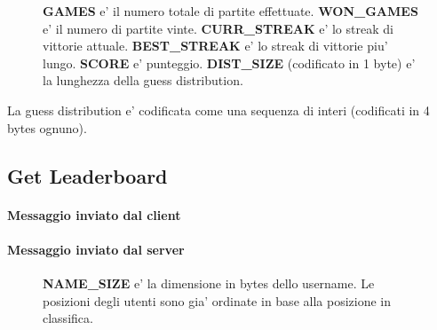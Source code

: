 \begin{center}
	\begin{figure}[h]
		\makebox[\textwidth]{\showasciiart{85ex}}
		\centering \textbf{GAMES} e' il numero totale di partite effettuate. \textbf{WON\_GAMES} e' il numero di partite vinte. \textbf{CURR\_STREAK} e' lo streak di vittorie attuale. \textbf{BEST\_STREAK} e' lo streak di vittorie piu' lungo. \textbf{SCORE} e' punteggio. \textbf{DIST\_SIZE} (codificato in 1 byte) e' la lunghezza della guess distribution.
	\end{figure}
\end{center}

La guess distribution e' codificata come una sequenza di interi (codificati in 4 bytes ognuno).

\subsection{Get Leaderboard}

\paragraph{Messaggio inviato dal client}

\begin{lrbox}{\asciiart}
	\begin{varwidth}{\maxdimen}
		\noindent
	\end{varwidth}
\end{lrbox}%

\begin{center}
	\begin{figure}[h]
		\makebox[\textwidth]{\showasciiart{40ex}}
	\end{figure}
\end{center}

\paragraph{Messaggio inviato dal server}

\begin{lrbox}{\asciiart}
	\begin{varwidth}{\maxdimen}
		\noindent
	\end{varwidth}
\end{lrbox}%

\begin{center}
	\begin{figure}[h]
		\makebox[\textwidth]{\showasciiart{85ex}}
		\centering \textbf{NAME\_SIZE} e' la dimensione in bytes dello username. Le posizioni degli utenti sono gia' ordinate in base alla posizione in classifica.
	\end{figure}
\end{center}

